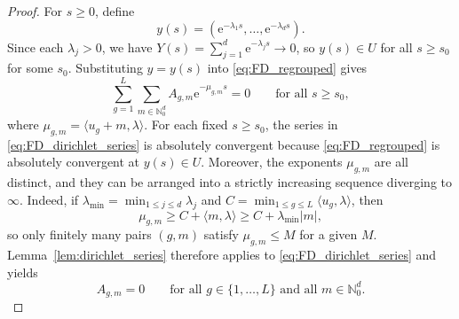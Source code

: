 \documentclass[10pt,a4paper]{amsart}
\begin{document}
\begin{proof}
For $s\ge0$, define 
\[
y(s)=(\mathrm{e}^{-\lambda_{1}s},\dots,\mathrm{e}^{-\lambda_{d}s}).
\]
Since each $\lambda_{j}>0$, we have $Y(s)=\sum_{j=1}^{d}\mathrm{e}^{-\lambda_{j}s}\to0$,
so $y(s)\in U$ for all $s\ge s_{0}$ for some $s_{0}$. Substituting
$y=y(s)$ into \eqref{eq:FD_regrouped} gives 
\begin{equation}
\sum_{g=1}^{L}\sum_{m\in\mathbb{N}_{0}^{d}}A_{g,m}\mathrm{e}^{-\mu_{g,m}s}=0\qquad\text{for all }s\ge s_{0},\label{eq:FD_dirichlet_series}
\end{equation}
where $\mu_{g,m}=\langle u_{g}+m,\lambda\rangle$. For each fixed
$s\ge s_{0}$, the series in \eqref{eq:FD_dirichlet_series} is absolutely
convergent because \eqref{eq:FD_regrouped} is absolutely convergent
at $y(s)\in U$. Moreover, the exponents $\mu_{g,m}$ are all distinct,
and they can be arranged into a strictly increasing sequence diverging
to $\infty$. Indeed, if $\lambda_{\min}=\min_{1\le j\le d}\lambda_{j}$
and $C=\min_{1\le g\le L}\langle u_{g},\lambda\rangle$, then 
\[
\mu_{g,m}\ge C+\langle m,\lambda\rangle\ge C+\lambda_{\min}|m|,
\]
so only finitely many pairs $(g,m)$ satisfy $\mu_{g,m}\le M$ for
a given $M$. Lemma~\ref{lem:dirichlet_series} therefore applies
to \eqref{eq:FD_dirichlet_series} and yields 
\begin{equation}
A_{g,m}=0\qquad\text{for all }g\in\{1,\dots,L\}\text{ and all }m\in\mathbb{N}_{0}^{d}.\label{eq:FD_Agm_zero}
\end{equation}


\end{proof}
\end{document}
